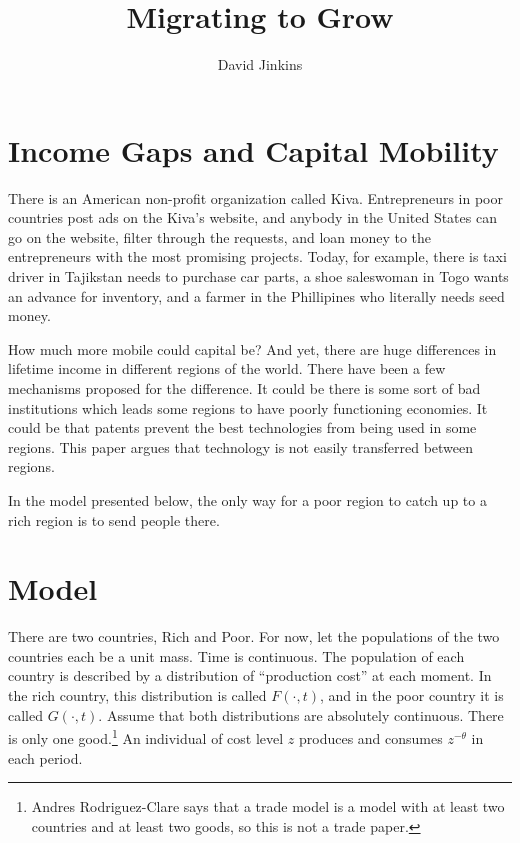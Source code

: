 \documentclass{article}
\title{Migrating to Grow}
\author{David Jinkins}
\begin{document}
\maketitle

\section{Income Gaps and Capital Mobility}

There is an American non-profit organization called Kiva.  Entrepreneurs in poor countries post ads on the Kiva's website, and anybody in the United States can go on the website, filter through the requests, and loan money to the entrepreneurs with the most promising projects.  Today, for example, there is taxi driver in Tajikstan needs to purchase car parts, a shoe saleswoman in Togo wants an advance for inventory, and a farmer in the Phillipines who literally needs seed money.

How much more mobile could capital be? And yet, there are huge differences in lifetime income in different regions of the world.  There have been a few mechanisms proposed for the difference.  It could be there is some sort of bad institutions which leads some regions to have poorly functioning economies.  It could be that patents prevent the best technologies from being used in some regions.  This paper argues that technology is not easily transferred between regions.   

In the model presented below, the only way for a poor region to catch up to a rich region is to send people there.  


\section{Model}
There are two countries, Rich and Poor.  For now, let the populations of the two countries each be a unit mass.  Time is continuous.  The population of each country is described by a distribution of ``production cost'' at each moment.  In the rich country, this distribution is called $F(\cdot,t)$, and in the poor country it is called $G(\cdot,t)$.  Assume that both distributions are absolutely continuous.  There is only one good.\footnote{Andres Rodriguez-Clare says that a trade model is a model with at least two countries and at least two goods, so this is not a trade paper.}  An individual of cost level $z$ produces and consumes $z^{-\theta}$ in each period.
\end{document}

